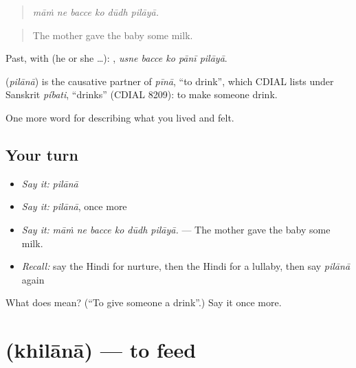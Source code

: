 \begin{quote}
     
\end{quote}

\begin{quote}
\emph{māṁ ne bacce ko dūdh pilāyā.}
\end{quote}

\begin{quote}
The mother gave the baby some milk.
\end{quote}

Past, with  (he or she …):     , \emph{usne bacce ko pānī pilāyā}.

\begin{cousinweb}
\textbf{} (\emph{pilānā}) is the causative partner of \emph{pīnā}, \textquotedblleft{}to drink\textquotedblright{}, which CDIAL lists under Sanskrit \emph{píbati}, \textquotedblleft{}drinks\textquotedblright{} (CDIAL 8209): to make someone drink.
\end{cousinweb}

\begin{grammarlens}[title={What you've built}]
One more word for describing what you lived and felt.
\end{grammarlens}

\subsection*{Your turn}
\begin{itemize}
\raggedright
  \item \emph{Say it:} \emph{pilānā}
  \item \emph{Say it:} \emph{pilānā}, once more
  \item \emph{Say it:} \emph{māṁ ne bacce ko dūdh pilāyā.} — The mother gave the baby some milk.
  \item \emph{Recall:} say the Hindi for nurture, then the Hindi for a lullaby, then say \emph{pilānā} again
\end{itemize}

\begin{tcolorbox}[breakable,colback=teal!4,colframe=teal!35!black,title={Before you move on}]
What does  mean? (\textquotedblleft{}To give someone a drink\textquotedblright{}.) Say it once more.
\end{tcolorbox}
\section[\texorpdfstring{\hi{खिलाना} (khilānā)}{खिलाना (khilānā)}]{ (khilānā) — to feed}

